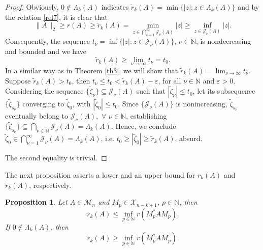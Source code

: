 \documentclass[12pt, reqno]{amsart}
\newtheorem{proposition}[theorem]{Proposition}
\theoremstyle{definition}
\theoremstyle{remark}
\numberwithin{equation}{section}
\begin{document}
\begin{proof}
Obviously, $0\notin\Lambda_{k}(A)$ indicates $\widetilde{r}_{k}(A)=\min\{|z|: z\in\Lambda_{k}(A)\}$ and by the relation \eqref{rel7}, it is clear that
\[
\|A\|_{2}\geq r(A)\geq\widetilde{r}_{k}(A)=\min_{z\in\bigcap_{\nu=1}^{\infty}\mathcal{J}_{\nu}(A)} |z|\geq
\inf_{z\in\mathcal{J}_{\nu}(A)}|z|.
\]
Consequently, the sequence $t_{\nu}=\inf\{|z|: z\in\mathcal{J}_{\nu}(A)\}$, $\nu\in\mathbb{N}$, is  nondecreasing and bounded and we have
\[
\widetilde{r}_{k}(A)\geq\lim_{\nu\to\infty}t_{\nu}=t_{0}.
\]
In a similar way as in Theorem \ref{th3}, we will show that $\widetilde{r}_{k}(A)=\lim_{\nu\to\infty}t_{\nu}$. Suppose $\widetilde{r}_{k}(A)>t_{0}$, then $t_{\nu}\leq t_{0}<\widetilde{r}_{k}(A)-\varepsilon$, for all $\nu\in\mathbb{N}$ and $\varepsilon>0$. Considering the sequence
$\{\widetilde{\zeta}_{\nu}\}\subseteq\mathcal{J}_{\nu}(A)$ such that $|\widetilde{\zeta}_{\nu}|\leq t_{0}$, let its subsequence $\{\widetilde{\zeta}_{s_{\nu}}\}$  converging to $\widetilde{\zeta}_{0}$, with $|\widetilde{\zeta}_{0}|\leq t_{0}$. Since $\{\mathcal{J}_{\nu}(A)\}$ is nonincreasing, $\widetilde{\zeta}_{s_{\nu}}$ eventually belong to $\mathcal{J}_{\nu}(A)$,\, $\forall\,\, \nu\in\mathbb{N}$, establishing $\{\widetilde{\zeta}_{s_{\nu}}\}\subseteq\bigcap_{\nu\in\mathbb{N}}\mathcal{J}_{\nu}(A)=\Lambda_{k}(A)$. Hence, we conclude  $\widetilde{\zeta}_{0}\in\bigcap_{\nu=1}^{\infty}\mathcal{J}_{\nu}(A)=\Lambda_{k}(A)$, i.e.  $t_{0}\geq|\widetilde{\zeta}_{0}|\geq\widetilde{r}_{k}(A)$, absurd.

The second equality is trivial.
\end{proof}
The next proposition asserts  a lower and an upper bound for  $r_{k}(A)$ and $\widetilde{r}_{k}(A)$, respectively.
\begin{proposition}
Let $A\in\mathcal{M}_{n}$ and $M_{p}\in\mathcal{X}_{n-k+1}$, $p\in\mathbb{N}$, then
\[
r_{k}(A)\leq\inf_{p\in\mathbb{N}}r(M_{p}^{*}AM_{p}).
\]
If $0\notin\Lambda_{k}(A)$, then $$\widetilde{r}_{k}(A)\geq\inf_{p\in\mathbb{N}}\widetilde{r}(M^{*}_{p}AM_{p}).$$
\end{proposition}
\end{document}
